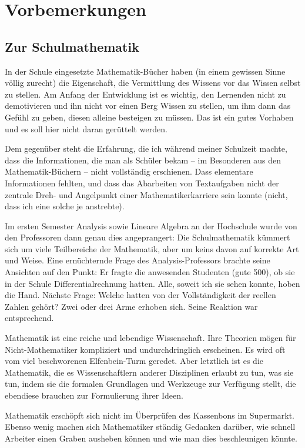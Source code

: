 \chapter{Vorbemerkungen}

\section{Zur Schulmathematik}

In der Schule eingesetzte Mathematik-Bücher haben (in einem gewissen Sinne völlig zurecht) die Eigenschaft, die Vermittlung des Wissens vor das Wissen selbst zu stellen. Am Anfang der Entwicklung ist es wichtig, den Lernenden nicht zu demotivieren und ihn nicht vor einen Berg Wissen zu stellen, um ihm dann das Gefühl zu geben, diesen alleine besteigen zu müssen. Das ist ein gutes Vorhaben und es soll hier nicht daran gerüttelt werden. 

Dem gegenüber steht die Erfahrung, die ich während meiner Schulzeit machte, dass die Informationen, die man als Schüler bekam -- im Besonderen aus den Mathematik-Büchern -- nicht vollständig erschienen. Dass elementare Informationen fehlten, und dass das Abarbeiten von Textaufgaben nicht der zentrale Dreh- und Angelpunkt einer Mathematikerkarriere sein konnte (nicht, dass ich eine solche je anstrebte).

Im ersten Semester Analysis sowie Lineare Algebra an der Hochschule wurde von den Professoren dann genau dies angeprangert: Die Schulmathematik kümmert sich um viele Teilbereiche der Mathematik, aber um keins davon auf korrekte Art und Weise. Eine ernüchternde Frage des Analysis-Professors brachte seine Ansichten auf den Punkt: Er fragte die anwesenden Studenten (gute 500), ob sie in der Schule Differentialrechnung hatten. Alle, soweit ich sie sehen konnte, hoben die Hand. Nächste Frage: Welche hatten von der Vollständigkeit der reellen Zahlen gehört? Zwei oder drei Arme erhoben sich. Seine Reaktion war entsprechend. 

Mathematik ist eine reiche und lebendige Wissenschaft. Ihre Theorien mögen für Nicht-Mathematiker kompliziert und undurchdringlich erscheinen. Es wird oft vom viel beschworenen Elfenbein-Turm geredet. Aber letztlich ist es die Mathematik, die es Wissenschaftlern anderer Disziplinen erlaubt zu tun, was sie tun, indem sie die formalen Grundlagen und Werkzeuge zur Verfügung stellt, die ebendiese brauchen zur Formulierung ihrer Ideen.

Mathematik erschöpft sich nicht im Überprüfen des Kassenbons im Supermarkt. Ebenso wenig machen sich Mathematiker ständig Gedanken darüber, wie schnell Arbeiter einen Graben ausheben können und wie man dies beschleunigen könnte. 

